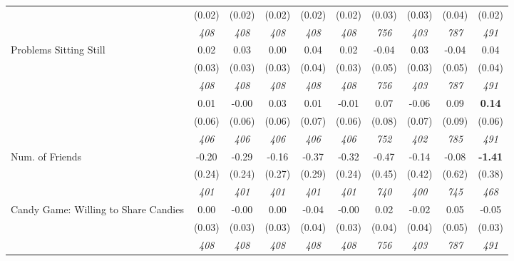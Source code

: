 \begin{tabular}{l c c c c c c c c c}
& (0.02) & (0.02) & (0.02) & (0.02) & (0.02) & (0.03) & (0.03) & (0.04) & (0.02) \\
& \textit{ 408 } & \textit{ 408 } & \textit{ 408 } & \textit{ 408 } & \textit{ 408 } & \textit{ 756 } & \textit{ 403 } & \textit{ 787 } & \textit{ 491 } \\
Problems Sitting Still & 0.02 & 0.03 & 0.00 & 0.04 & 0.02 & -0.04 & 0.03 & -0.04 & 0.04 \\
& (0.03) & (0.03) & (0.03) & (0.04) & (0.03) & (0.05) & (0.03) & (0.05) & (0.04) \\
& \textit{ 408 } & \textit{ 408 } & \textit{ 408 } & \textit{ 408 } & \textit{ 408 } & \textit{ 756 } & \textit{ 403 } & \textit{ 787 } & \textit{ 491 } \\
& 0.01 & -0.00 & 0.03 & 0.01 & -0.01 & 0.07 & -0.06 & 0.09 & \textbf{0.14} \\
& (0.06) & (0.06) & (0.06) & (0.07) & (0.06) & (0.08) & (0.07) & (0.09) & (0.06) \\
& \textit{ 406 } & \textit{ 406 } & \textit{ 406 } & \textit{ 406 } & \textit{ 406 } & \textit{ 752 } & \textit{ 402 } & \textit{ 785 } & \textit{ 491 } \\
Num. of Friends & -0.20 & -0.29 & -0.16 & -0.37 & -0.32 & -0.47 & -0.14 & -0.08 & \textbf{-1.41} \\
& (0.24) & (0.24) & (0.27) & (0.29) & (0.24) & (0.45) & (0.42) & (0.62) & (0.38) \\
& \textit{ 401 } & \textit{ 401 } & \textit{ 401 } & \textit{ 401 } & \textit{ 401 } & \textit{ 740 } & \textit{ 400 } & \textit{ 745 } & \textit{ 468 } \\
Candy Game: Willing to Share Candies & 0.00 & -0.00 & 0.00 & -0.04 & -0.00 & 0.02 & -0.02 & 0.05 & -0.05 \\
& (0.03) & (0.03) & (0.03) & (0.04) & (0.03) & (0.04) & (0.04) & (0.05) & (0.03) \\
& \textit{ 408 } & \textit{ 408 } & \textit{ 408 } & \textit{ 408 } & \textit{ 408 } & \textit{ 756 } & \textit{ 403 } & \textit{ 787 } & \textit{ 491 } \\
\bottomrule
\end{tabular}
